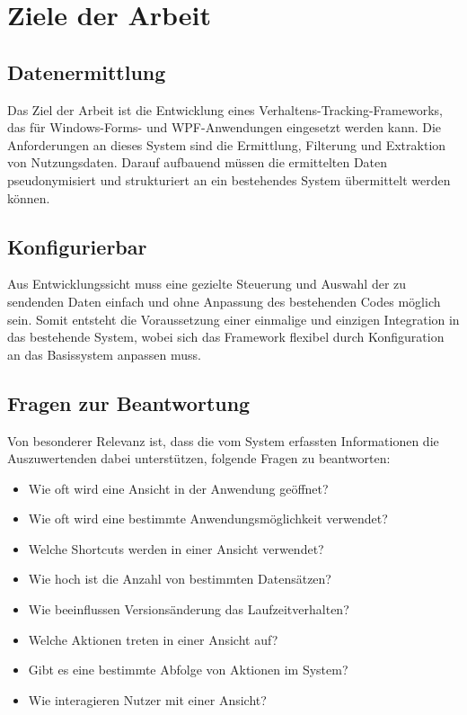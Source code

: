 \section{Ziele der Arbeit}

\subsection{Datenermittlung}
Das Ziel der Arbeit ist die Entwicklung eines Verhaltens-Tracking-Frameworks, das für Windows-Forms- und WPF-Anwendungen eingesetzt werden kann. Die Anforderungen an dieses System sind die Ermittlung, Filterung und Extraktion von Nutzungsdaten. Darauf aufbauend müssen die ermittelten Daten pseudonymisiert und strukturiert an ein bestehendes System übermittelt werden können.

\subsection{Konfigurierbar}
Aus Entwicklungssicht muss eine gezielte Steuerung und Auswahl der zu sendenden Daten einfach und ohne Anpassung des bestehenden Codes möglich sein. Somit entsteht die Voraussetzung einer einmalige und einzigen Integration in das bestehende System, wobei sich das Framework flexibel durch Konfiguration an das Basissystem anpassen muss.

\subsection{Fragen zur Beantwortung}
\label{subsec:initial_questions}
Von besonderer Relevanz ist, dass die vom System erfassten Informationen die Auszuwertenden dabei unterstützen, folgende Fragen zu beantworten:

\begin{itemize}
    \item Wie oft wird eine Ansicht in der Anwendung geöffnet?
    \item Wie oft wird eine bestimmte Anwendungsmöglichkeit verwendet?
    \item Welche Shortcuts werden in einer Ansicht verwendet?
    \item Wie hoch ist die Anzahl von bestimmten Datensätzen?
    \item Wie beeinflussen Versionsänderung das Laufzeitverhalten?
    \item Welche Aktionen treten in einer Ansicht auf?
    \item Gibt es eine bestimmte Abfolge von Aktionen im System?
    \item Wie interagieren Nutzer mit einer Ansicht?
\end{itemize}

